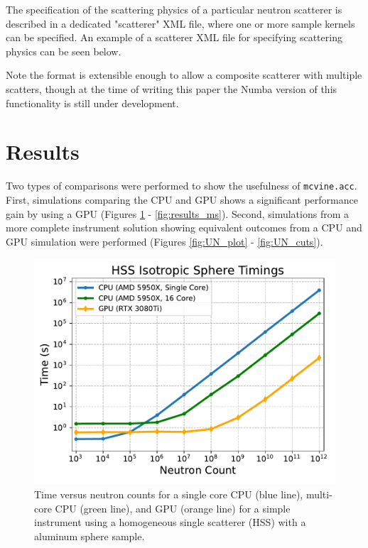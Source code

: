 The specification of the scattering physics of a particular neutron scatterer is described in a dedicated "scatterer" XML file, where one or more sample kernels can be specified.
An example of a scatterer XML file for specifying scattering physics can be seen below.

\vspace{1mm}

\vspace{1mm}

Note the format is extensible enough to allow a composite scatterer with multiple scatters, though at the time of writing this paper the Numba version of this functionality is still under development.


\section{Results}

Two types of comparisons were performed to show the usefulness of \texttt{mcvine.acc}. First, simulations comparing the CPU and GPU shows a significant performance gain by using a GPU (Figures \ref{fig:results_isotropic_sphere} - \ref{fig:results_ms}).
Second, simulations from a more complete instrument solution showing equivalent outcomes from a CPU and GPU simulation were performed  (Figures \ref{fig:UN_plot} - \ref{fig:UN_cuts}). 

\begin{figure}[h]
    \centering
    \includegraphics[width=\columnwidth]{figures/mcvine_hss_isotropic_timings.pdf}
    \caption{Time versus neutron counts for  a single core CPU (blue line), multi-core CPU (green line), and GPU (orange line) for a simple instrument using a homogeneous single scatterer (HSS) with a aluminum sphere sample.}
    \label{fig:results_isotropic_sphere}
\end{figure}

